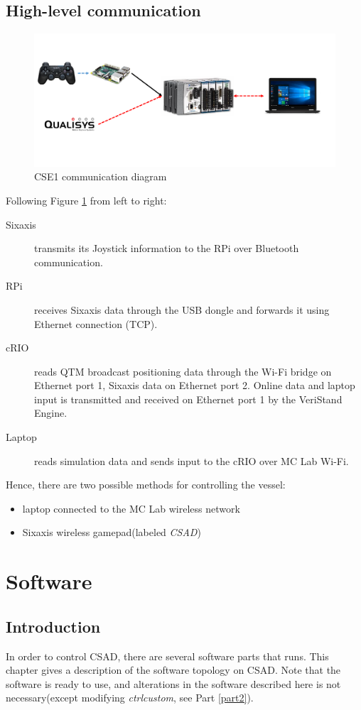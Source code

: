 \section{High-level communication}\label{sec:high_level_communication}
\begin{figure}[htb!]
	\centering
	\includegraphics[width=\textwidth]{fig/high-level_control.pdf}
	\caption{CSE1 communication diagram}
	\label{fig: CSE1 communication}
\end{figure}
Following Figure \ref{fig: CSE1 communication} from left to right:
\begin{description}
	\item [{Sixaxis}] transmits its Joystick information to the RPi over Bluetooth communication. 
	\item [{RPi}] receives Sixaxis data through the USB dongle and forwards it using Ethernet connection (TCP).
	\item [{cRIO}] reads QTM broadcast positioning data through the Wi-Fi bridge on Ethernet port 1, Sixaxis data on Ethernet port 2. Online data and laptop input is transmitted and received on Ethernet port 1 by the VeriStand Engine.
	\item [{Laptop}] reads simulation data and sends input to the cRIO over MC Lab Wi-Fi.
\end{description}
Hence, there are two possible methods for controlling the vessel:
\begin{itemize}
	\item laptop connected to the MC Lab wireless network
	\item Sixaxis wireless gamepad(labeled \textit{CSAD})
\end{itemize}


\chapter{Software}
\section{Introduction}
In order to control CSAD, there are several software parts that runs. This chapter gives a description of the software topology on CSAD. Note that the software is ready to use, and alterations in the software described here is not necessary(except modifying \textit{ctrl\textunderscore custom}, see Part \ref{part2}).
